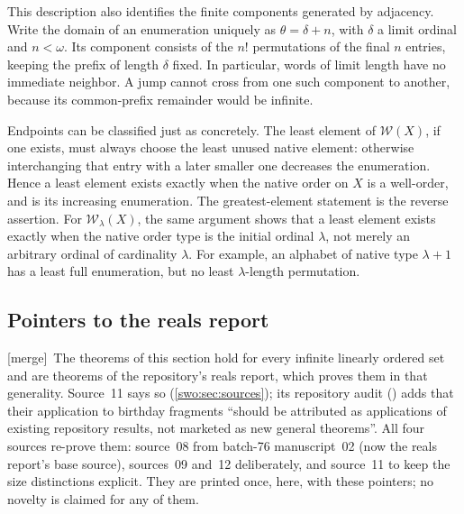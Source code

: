 \documentclass[11pt]{article}
\theoremstyle{definition}
\theoremstyle{remark}
\newcommand{\WO}{\mathcal W}
\newcommand{\merge}{\textsf{[merge]}}
\begin{document}
This description also identifies the finite components generated
by adjacency.  Write the domain of an enumeration uniquely as
\(\theta=\delta+n\), with \(\delta\) a limit ordinal and
\(n<\omega\).  Its component consists of the \(n!\) permutations
of the final \(n\) entries, keeping the prefix of length
\(\delta\) fixed.  In particular, words of limit length have
no immediate neighbor.  A jump cannot cross from one such
component to another, because its common-prefix remainder
would be infinite.

Endpoints can be classified just as concretely.
The least element of \(\WO(X)\), if one exists, must always
choose the least unused native element: otherwise interchanging
that entry with a later smaller one decreases the enumeration.
Hence a least element exists exactly when the native order
on \(X\) is a well-order, and is its increasing enumeration.
The greatest-element statement is the reverse assertion.
For \(\WO_\lambda(X)\), the same argument shows that
a least element exists exactly when the native order type is
the initial ordinal \(\lambda\), not merely an arbitrary
ordinal of cardinality \(\lambda\).
For example, an alphabet of native type \(\lambda+1\)
has a least full enumeration, but no least
\(\lambda\)-length permutation.



\subsection{Pointers to the reals report}\label{swo:sub:lwo-pointer}

\merge\ The theorems of this section hold for every infinite linearly ordered
set and are theorems of the repository's reals report, which proves them in
that generality. Source~11 says so (\cref{swo:sec:sources}); its repository
audit () adds that their application
to birthday fragments ``should be attributed as applications of existing
repository results, not marketed as new general theorems''. All four sources
re-prove them: source~08 from batch-76 manuscript~02 (now the reals report's
base source), sources~09 and~12 deliberately, and source~11 to keep the size
distinctions explicit. They are printed once, here, with these pointers; no
novelty is claimed for any of them.
\end{document}
